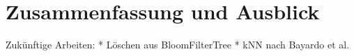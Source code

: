 \chapter{Zusammenfassung und Ausblick}\label{ch:zusammenfassung}

Zukünftige Arbeiten: 
* Löschen aus BloomFilterTree
* kNN nach Bayardo et al. 